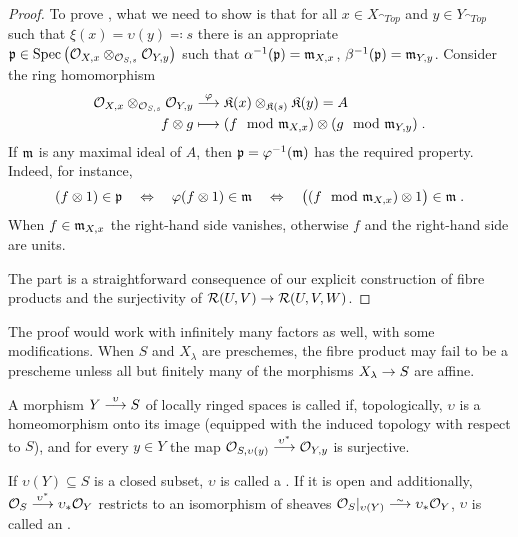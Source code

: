 \documentclass[a4paper,parskip=half,numbers=enddot, DIV=12]{scrreprt}
\begin{document}
\begin{proof}
    To prove , what we need to show is that for all $x\in X_{\cat{Top}}$ and $y\in Y_{\cat{Top}}$ such that $\xi(x) = \upsilon(y)\eqqcolon s$ there is an appropriate $\mathfrak{p}\in \operatorname{Spec}\left(\mathcal{O}_{X,x} \otimes_{\mathcal{O}_{S,s}}\mathcal{O}_{Y,y}\right)$ such that $\alpha^{-1}(\mathfrak{p}) = \mathfrak{m}_{X,x}$, $\beta^{-1}(\mathfrak{p}) = \mathfrak{m}_{Y,y}$. Consider the ring homomorphism
    \begin{align*}
        \Oo_{X,x}\otimes_{\Oo_{S,s}} \Oo_{Y,y} &\morphism[\phi] \KK(x) \otimes_{\KK(s)}\KK(y) = A\\
        f\otimes g &\longmapsto (f\mod \mm_{X,x}) \otimes (g\mod \mm_{Y,y})\;.
    \end{align*}
    If $\mathfrak{m}$ is any maximal ideal of $A$, then $\mathfrak{p} = \varphi^{-1}(\mathfrak{m})$ has the required property. Indeed, for instance,
    \begin{align*}
        (f\otimes 1)\in\mathfrak{p} \quad\Leftrightarrow\quad \varphi(f\otimes 1)\in \mathfrak{m} \quad\Leftrightarrow\quad \big((f\mod{\mathfrak{m}}_{X,x})\otimes 1\big) \in\mathfrak{m}\;.
    \end{align*}
    When $f\in \mathfrak{m}_{X,x}$ the right-hand side vanishes, otherwise $f$ and the right-hand side are units.
    
    The part  is a straightforward consequence of our explicit construction of fibre products and the surjectivity of $\Rr(U,V) \morphism \Rr(U,V,W)$.
\end{proof}

\begin{rem}
    The proof would work with infinitely many factors as well, with some modifications. When $S$ and $X_\lambda$ are preschemes, the fibre product may fail to be a prescheme unless all but finitely many of the morphisms $X_\lambda \morphism S$ are affine.
\end{rem}

\begin{defi} 
    A morphism $Y\morphism[\upsilon] S$ of locally ringed spaces is called  if, topologically, $\upsilon$ is a homeomorphism onto its image (equipped with the induced topology with respect to $S$), and for every $y\in Y$ the map $\Oo_{S,\upsilon(y)} \morphism[\upsilon^*]\Oo_{Y,y}$ is surjective. 
       
    If $\upsilon(Y)\subseteq S$ is a closed subset, $\upsilon$ is called a . If it is open and additionally, $\Oo_S\morphism[\upsilon^*]\upsilon_*\Oo_Y$ restricts to an isomorphism of sheaves $\Oo_S|_{\upsilon(Y)}\isomorphism\upsilon_*\Oo_Y$, $\upsilon$ is called an .
\end{defi}
\end{document}
